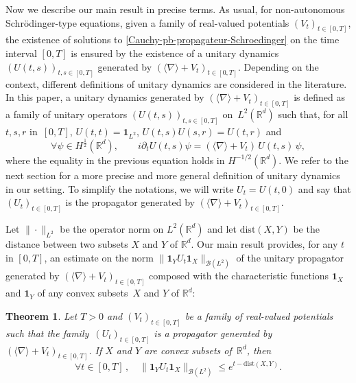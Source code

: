\documentclass[12pt]{article}
\newcommand{\jnabla}{{\langle\nabla\rangle}}
\newcommand{\dXY}{{\mathrm{dist}(X,Y)}}
\theoremstyle{plain}
\newtheorem{theo}{Theorem}[section]
\begin{document}
Now we describe our main result in precise terms. As usual, for non-autonomous Schrödin\-ger-type equations, given a family of real-valued potentials $(V_t)_{t\in[0,T]}$, the existence of solutions to \eqref{Cauchy-pb-propagateur-Schroedinger} on the time interval $[0,T]$ is ensured by the existence of a unitary dynamics~$(U(t,s))_{t,s\in[0,T]}$ generated by $(\jnabla+V_t)_{t\in[0,T]}$. Depending on the context, different definitions of unitary dynamics are considered in the literature. In this paper, a unitary dynamics generated by $(\jnabla+V_t)_{t\in[0,T]}$ is defined as a family of unitary operators $(U(t,s))_{t,s\in[0,T]}$ on~$L^2(\mathbb{R}^d)$ such that, for all $t,s,r$ in~$[0,T]$, $U(t,t)=\mathbf{1}_{L^2}$, $U(t,s)U(s,r)=U(t,r)$ and
\begin{equation}
    \forall\psi\in H^{\frac12}(\mathbb{R}^d), \qquad i\partial_tU(t,s)\psi=(\jnabla+V_t)\,U(t,s)\,\psi,
\end{equation}
where the equality in the previous equation holds in $H^{-1/2}(\mathbb{R}^d)$. We refer to the next section for a more precise and more general definition of unitary dynamics in our setting. To simplify the notations, we will write $U_t=U(t,0)$ and say that $(U_t)_{t\in[0,T]}$ is the propagator generated by $(\jnabla+V_t)_{t\in[0,T]}$.

Let $\|\cdot\|_{L^2}$ be the operator norm on $L^2(\mathbb{R}^d)$ and let $\mathrm{dist}(X,Y)$ be the distance between two subsets $X$ and $Y$ of $\mathbb{R}^d$.  Our main result provides, for any $t$ in $[0,T]$, an estimate on the norm $\|\mathbf{1}_YU_t\mathbf{1}_X\|_{\mathcal{B}(L^2)}$ of the unitary propagator generated by $(\jnabla+V_t)_{t\in[0,T]}$ composed with the characteristic functions $\mathbf{1}_X$ and $\mathbf{1}_Y$ of any convex subsets~$X$ and $Y$ of $\mathbb{R}^d$:
%
\begin{theo}\label{th:max-vel}
Let $T>0$ and $(V_t)_{t\in[0,T]}$ be a family of real-valued potentials such that the family~$(U_t)_{t\in[0,T]}$ is a propagator generated by $(\langle\nabla\rangle+V_t)_{t\in[0,T]}$. If $X$ and $Y$ are convex subsets of~$\mathbb{R}^d$, then
\begin{equation}\label{eq:main-est}
        \forall t\in [0,T]\,,\quad \|\mathbf{1}_Y U_t \mathbf{1}_X\|_{\mathcal{B}(L^2)} \le e^{t-\dXY}.
    \end{equation}
\end{theo}
\end{document}
